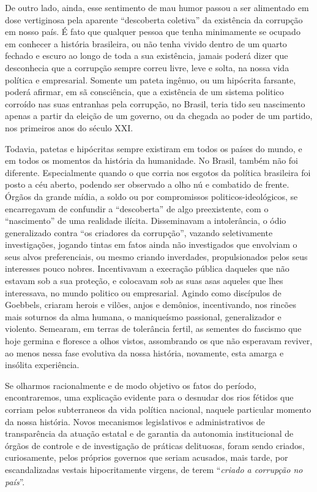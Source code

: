 De outro lado, ainda, esse sentimento de mau humor passou a ser
alimentado em dose vertiginosa pela aparente ``descoberta coletiva'' da
existência da corrupção em nosso país. É fato que qualquer pessoa que
tenha minimamente se ocupado em conhecer a história brasileira, ou não
tenha vivido dentro de um quarto fechado e escuro ao longo de toda a sua
existência, jamais poderá dizer que desconhecia que a corrupção sempre
correu livre, leve e solta, na nossa vida política e empresarial.
Somente um pateta ingênuo, ou um hipócrita farsante, poderá afirmar, em
sã consciência, que a existência de um sistema politico corroído nas
suas entranhas pela corrupção, no Brasil, teria tido seu nascimento
apenas a partir da eleição de um governo, ou da chegada ao poder de um
partido, nos primeiros anos do século XXI.

Todavia, patetas e hipócritas sempre existiram em todos os países do
mundo, e em todos os momentos da história da humanidade. No Brasil,
também não foi diferente. Especialmente quando o que corria nos esgotos
da política brasileira foi posto a céu aberto, podendo ser observado a
olho nú e combatido de frente. Órgãos da grande mídia, a soldo ou por
compromissos politicos-ideológicos, se encarregavam de confundir a
``descoberta'' de algo preexistente, com o ``nascimento'' de uma
realidade ilícita. Disseminavam a intolerância, o ódio generalizado
contra ``os criadores da corrupção'', vazando seletivamente
investigações, jogando tintas em fatos ainda não investigados que
envolviam o seus alvos preferenciais, ou mesmo criando inverdades,
propulsionados pelos seus interesses pouco nobres. Incentivavam a
execração pública daqueles que não estavam sob a sua proteção, e
colocavam sob as suas asas aqueles que lhes interessava, no mundo
politico ou empresarial. Agindo como discípulos de Goebbels, criaram
herois e vilões, anjos e demônios, incentivando, nos rincões mais
soturnos da alma humana, o maniqueísmo passional, generalizador e
violento. Semearam, em terras de tolerância fertil, as sementes do
fascismo que hoje germina e floresce a olhos vistos, assombrando os que
não esperavam reviver, ao menos nessa fase evolutiva da nossa história,
novamente, esta amarga e insólita experiência.

Se olharmos racionalmente e de modo objetivo os fatos do período,
encontraremos, uma explicação evidente para o desnudar dos rios fétidos
que corriam pelos subterraneos da vida política nacional, naquele
particular momento da nossa história. Novos mecanismos legislativos e
administrativos de transparência da atuação estatal e de garantia da
autonomia institucional de órgãos de controle e de investigação de
práticas delituosas, foram sendo criados, curiosamente, pelos próprios
governos que seriam acusados, mais tarde, por escandalizadas vestais
hipocritamente virgens, de terem ``\emph{criado a corrupção no país}''.

